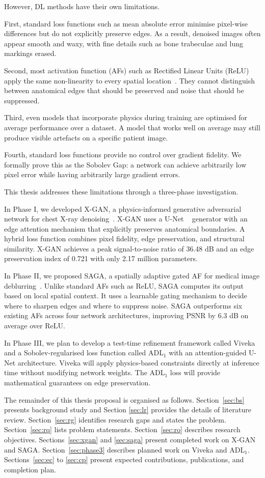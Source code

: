 However, DL methods have their own limitations.

First, standard loss functions such as mean absolute error minimise pixel-wise differences but do not explicitly preserve edges. As a result, denoised images often appear smooth and waxy, with fine details such as bone trabeculae and lung markings erased.

Second, most activation function (AFs) such as Rectified Linear Units (ReLU) apply the same non-linearity to every spatial location~\citep{nair2010rectified}. They cannot distinguish between anatomical edges that should be preserved and noise that should be suppressed.

Third, even models that incorporate physics during training are optimised for average performance over a dataset. A model that works well on average may still produce visible artefacts on a specific patient image.

Fourth, standard loss functions provide no control over gradient fidelity. We formally prove this as the Sobolev Gap: a network can achieve arbitrarily low pixel error while having arbitrarily large gradient errors.

This thesis addresses these limitations through a three-phase investigation.

In Phase I, we developed X-GAN, a physics-informed generative adversarial network for chest X-ray denoising~\citep{siju2026xgan}. X-GAN uses a U-Net ~\citep{ronneberger2015unet} generator with an edge attention mechanism that explicitly preserves anatomical boundaries. A hybrid loss function combines pixel fidelity, edge preservation, and structural similarity. X-GAN achieves a peak signal-to-noise ratio of 36.48 dB and an edge preservation index of 0.721 with only 2.17 million parameters.

In Phase II, we proposed SAGA, a spatially adaptive gated AF for medical image deblurring~\citep{siju2026saga}. Unlike standard AFs such as ReLU, SAGA computes its output based on local spatial context. It uses a learnable gating mechanism to decide where to sharpen edges and where to suppress noise. SAGA outperforms six existing AFs across four network architectures, improving PSNR by 6.3 dB on average over ReLU.

In Phase III, we plan to develop a test-time refinement framework called Viveka and a Sobolev-regularised loss function called ADL\(_1\) with an attention-guided U-Net architecture. Viveka will apply physics-based constraints directly at inference time without modifying network weights. The ADL\(_1\) loss will provide mathematical guarantees on edge preservation.

The remainder of this thesis proposal is organised as follows. Section~\ref{sec:bs} presents background study and Section \ref{sec:lr} provides the details of literature review. Section~\ref{sec:rg} identifies research gaps and states the problem. Section~\ref{sec:rq} lists problem statements. Section~\ref{sec:ro} describes research objectives. Sections~\ref{sec:xgan} and \ref{sec:saga} present completed work on X-GAN and SAGA. Section~\ref{sec:phase3} describes planned work on Viveka and ADL\(_1\). Sections~\ref{sec:ec} to \ref{sec:cp} present expected contributions, publications, and completion plan.